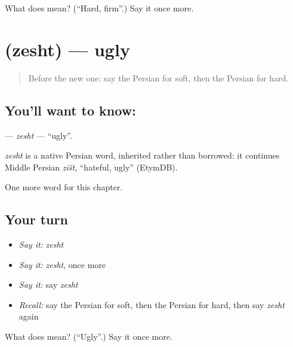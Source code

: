 \begin{tcolorbox}[breakable,colback=teal!4,colframe=teal!35!black,title={Before you move on}]
What does  mean? (\textquotedblleft{}Hard, firm\textquotedblright{}.) Say it once more.
\end{tcolorbox}
\section[\texorpdfstring{\fa{زشت} (zesht)}{زشت (zesht)}]{ (zesht) — ugly}

\label{lesson:FA-C125-zesht}



\begin{quote}
Before the new one: say the Persian for soft, then the Persian for hard.
\end{quote}

\subsection*{You'll want to know: }
\textbf{} — \emph{zesht} — \textquotedblleft{}ugly\textquotedblright{}.

\begin{cousinweb}
\emph{zesht} is a native Persian word, inherited rather than borrowed: it continues Middle Persian \emph{zišt}, \textquotedblleft{}hateful, ugly\textquotedblright{} (EtymDB).
\end{cousinweb}

\begin{grammarlens}[title={What you've built}]
One more word for this chapter.
\end{grammarlens}

\subsection*{Your turn}
\begin{itemize}
\raggedright
  \item \emph{Say it:} \emph{zesht}
  \item \emph{Say it:} \emph{zesht}, once more
  \item \emph{Say it:} say \emph{zesht}
  \item \emph{Recall:} say the Persian for soft, then the Persian for hard, then say \emph{zesht} again
\end{itemize}

\begin{tcolorbox}[breakable,colback=teal!4,colframe=teal!35!black,title={Before you move on}]
What does  mean? (\textquotedblleft{}Ugly\textquotedblright{}.) Say it once more.
\end{tcolorbox}
